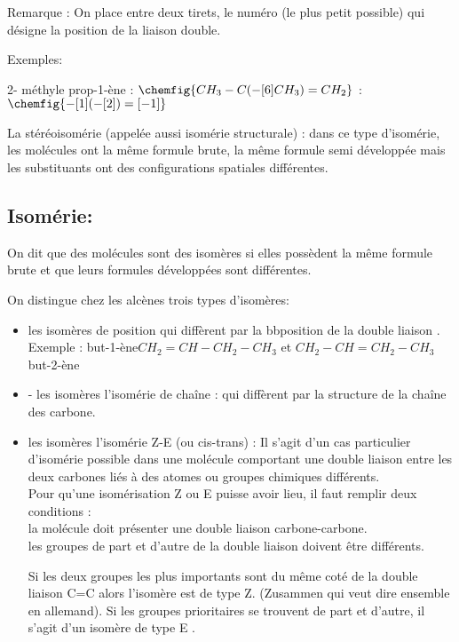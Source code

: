 \documentclass[12pt]{article}
\begin{document}
Remarque : On place entre deux tirets, le numéro (le plus petit possible) qui désigne la position de la liaison double.

Exemples: 

2- méthyle prop-1-ène : $\chemfig{CH_3-C(-[6]CH_3)=CH_2}$ :\hspace{1cm} $\chemfig{-[1](-[2])=[-1]}$

La stéréoisomérie (appelée aussi isomérie structurale) : dans ce type d’isomérie, les molécules ont la même formule brute, la même formule semi développée mais les substituants ont des configurations spatiales différentes.

\subsection{Isomérie:}
On dit que des molécules sont des isomères si elles possèdent la même formule brute et que leurs formules développées sont différentes.

On distingue chez les alcènes trois types d'isomères:
\begin{itemize}
  \item les isomères de position qui diffèrent par la bbposition de la double liaison .
    \\Exemple  : but-1-ène$CH_2=CH-CH_2-CH_3$ et $CH_2-CH=CH_2-CH_3$ but-2-ène
  \item - les isomères l'isomérie de chaîne : qui diffèrent par la structure de la chaîne des carbone.
  \item les isomères l'isomérie Z-E (ou cis-trans) :
    Il s’agit d’un cas particulier d’isomérie possible dans une molécule comportant une double liaison entre les deux
carbones liés à des atomes ou groupes chimiques différents.
\\Pour qu’une isomérisation Z ou E puisse avoir lieu, il faut remplir deux conditions :
\\la molécule doit présenter une double liaison carbone-carbone.
\\les groupes de part et d’autre de la double liaison doivent être différents.

Si les deux groupes les plus importants sont du même coté de la double liaison C=C alors l’isomère est de type Z.
(Zusammen qui veut dire ensemble en allemand).
Si les groupes prioritaires se trouvent de part et d’autre, il s’agit d’un isomère de type E .

    \end{itemize}
\end{document}
